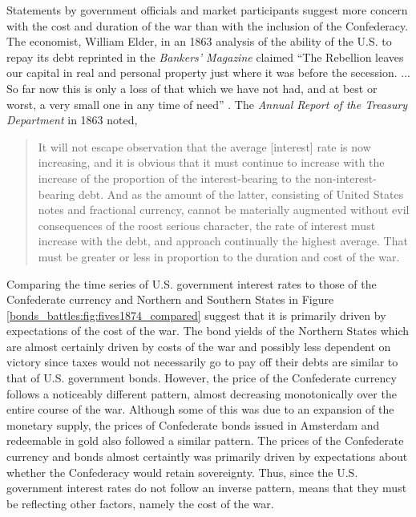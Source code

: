 Statements by government officials and market participants suggest more concern with the cost and duration of the war than with the inclusion of the Confederacy.
The economist, William Elder, in an 1863 analysis of the ability of the U.S. to repay its debt reprinted in the \textit{Bankers'  Magazine} claimed ``The Rebellion leaves our capital in real and personal property just where it was before the secession. ... So far now this is only a loss of that which we have not had, and at best or worst, a very small one in any time of need'' \parencite[19]{Elder1863}.
The \textit{Annual Report of the Treasury Department} in 1863 noted,
\begin{quote}
It will not escape observation that the average [interest] rate is now increasing,
and it is obvious that it must continue to increase with the increase of the proportion
of the interest-bearing to the non-interest-bearing debt. And as the
amount of the latter, consisting of United States notes and fractional currency,
cannot be materially augmented without evil consequences of the roost serious
character, the rate of interest must increase with the debt, and approach continually
the highest average. That must be greater or less in proportion to the
duration and cost of the war. \parencite[13]{Treasury1863}
\end{quote}

Comparing the time series of U.S. government interest rates to those of the Confederate currency and Northern and Southern States in Figure \ref{bonds_battles:fig:fives1874_compared} suggest that it is primarily driven by expectations of the cost of the war.
The bond yields of the Northern States which are almost certainly driven by costs of the war and possibly less dependent on victory since taxes would not necessarily go to pay off their debts are similar to that of U.S. government bonds.
However, the price of the Confederate currency follows a noticeably different pattern, almost decreasing monotonically over the entire course of the war.
Although some of this was due to an expansion of the monetary supply, the prices of Confederate bonds issued in Amsterdam and redeemable in gold also followed a similar pattern.
The prices of the Confederate currency and bonds almost certaintly was primarily driven by expectations about whether the Confederacy would retain sovereignty.
Thus, since the U.S. government interest rates do not follow an inverse pattern, means that they must be reflecting other factors, namely the cost of the war.

